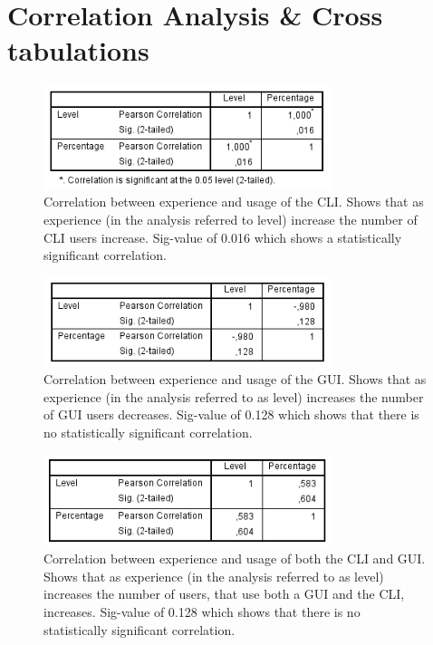 \documentclass[a4paper,oneside]{bth} %
\begin{document}
		\chapter{Correlation Analysis \& Cross tabulations}
		\begin{figure}[H]
			\centering
			\includegraphics[width=0.75\textwidth]{graphs/correlation-between-knowledge-and-usage-of-cli.png}
			\caption{Correlation between experience and usage of the CLI. Shows that as experience (in the analysis referred to level) increase the number of CLI users increase. Sig-value of 0.016 which shows a statistically significant correlation.}
			\label{fig:Correlation between experience and usage of the CLI.}
		\end{figure}
		
		\begin{figure}[H]
			\centering
			\includegraphics[width=0.75\textwidth]{graphs/correlation-between-knowledge-and-usage-of-gui.png}
			\caption{Correlation between experience and usage of the GUI. Shows that as experience (in the analysis referred to as level) increases the number of GUI users decreases. Sig-value of 0.128 which shows that there is no statistically significant correlation.}
			\label{fig:Correlation between experience and usage of the GUI.}
		\end{figure}
		
		\begin{figure}[H]
			\centering
			\includegraphics[width=0.75\textwidth]{graphs/correlation-between-knowledge-and-usage-of-both.png}
			\caption{Correlation between experience and usage of both the CLI and GUI. Shows that as experience (in the analysis referred to as level) increases the number of users, that use both a GUI and the CLI, increases. Sig-value of 0.128 which shows that there is no statistically significant correlation.}
			\label{fig:Correlation between experience and usage of both the CLI and GUI.}
		\end{figure}
		
\end{document}
